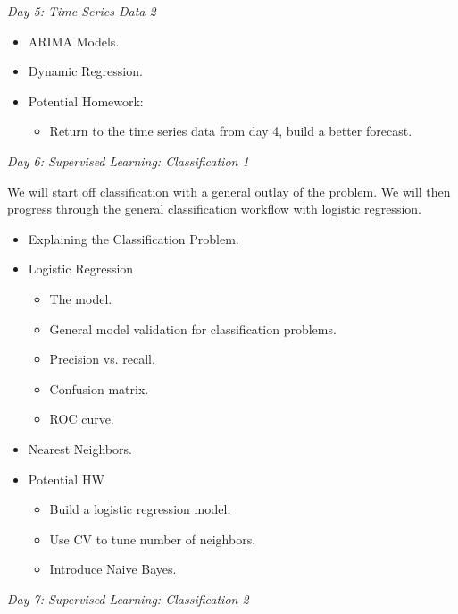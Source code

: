 \documentclass[12pt]{article}
\begin{document}
	\vspace{2mm}
	\noindent
	\textit{\large{Day 5: Time Series Data 2}} 
	\begin{itemize}
		\item ARIMA Models.
		\item Dynamic Regression.
		\item Potential Homework:
		\begin{itemize}
			\item Return to the time series data from day 4, build a better forecast.
		\end{itemize}
	\end{itemize}
	
	\vspace{2mm}
	\noindent
	\textit{\large{Day 6: Supervised Learning: Classification 1}}
	
	\noindent
	We will start off classification with a general outlay of the problem. We will then progress through the general classification workflow with logistic regression.
	
	\noindent
	\begin{itemize}
		\item Explaining the Classification Problem.
		\item Logistic Regression
			\begin{itemize}
				\item The model.
				\item General model validation for classification problems.
				\item Precision vs. recall.
				\item Confusion matrix.
				\item ROC curve.
			\end{itemize}
		\item Nearest Neighbors.
		\item Potential HW
			\begin{itemize}
				\item Build a logistic regression model.
				\item Use CV to tune number of neighbors.
				\item Introduce Naive Bayes.
			\end{itemize}
	\end{itemize}
	
	\vspace{2mm}
	\noindent
	\textit{\large{Day 7: Supervised Learning: Classification 2}}
	
\end{document}
